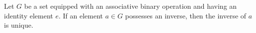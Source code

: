 Let $G$ be a set equipped with an associative binary operation and having an identity element $e$. If an element $a \in G$ possesses an inverse, then the inverse of $a$ is unique.

